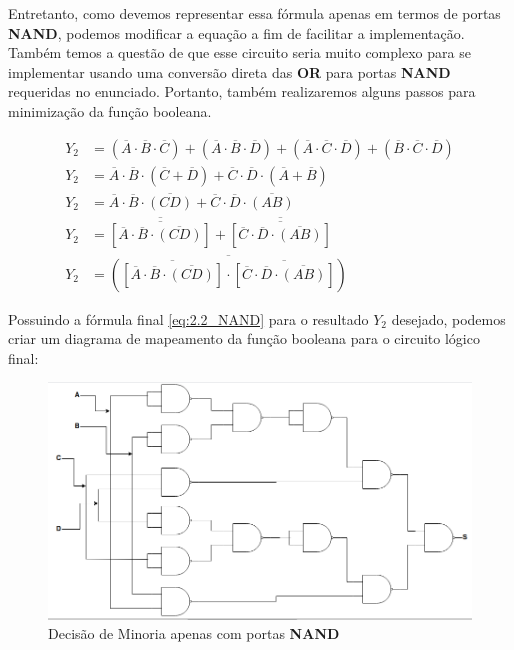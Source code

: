 \documentclass[12pt]{article}
\begin{document}
Entretanto, como devemos representar essa fórmula apenas em termos de portas
\textbf{NAND}, podemos modificar a equação a fim de facilitar a implementação.
Também temos a questão de que esse circuito seria muito complexo para se
implementar usando uma conversão direta das \textbf{OR} para portas
\textbf{NAND} requeridas no enunciado. Portanto, também realizaremos alguns
passos para minimização da função booleana.

\begin{align}
  Y_{2} &= (\overline{A} \cdot \overline{B} \cdot \overline{C}) + (\overline{A} \cdot \overline{B} \cdot \overline{D}) + (\overline{A} \cdot \overline{C} \cdot \overline{D}) + (\overline{B} \cdot \overline{C} \cdot \overline{D})\\
  Y_{2} &= \overline{A}\cdot \overline{B} \cdot (\overline{C} + \overline{D}) + \overline{C} \cdot \overline{D} \cdot (\overline{A} + \overline{B})\\
  Y_{2} &= \overline{A}\cdot\overline{B} \cdot \overline{(CD)} + \overline{C}\cdot\overline{D} \cdot \overline{(AB)}\\
  Y_{2} &= \overline{\overline{ \left[ \overline{A}\cdot\overline{B} \cdot \overline{(CD)} \right] }} + \overline{\overline{ \left[ \overline{C}\cdot\overline{D} \cdot \overline{(AB)} \right] }}\\
  Y_{2} &= \overline{ \left( \overline{ \left[ \overline{A}\cdot\overline{B} \cdot \overline{(CD)} \right] } \cdot  \overline{ \left[ \overline{C}\cdot\overline{D} \cdot \overline{(AB)} \right] } \right)} \label{eq:2.2_NAND}
\end{align}

Possuindo a fórmula final \ref{eq:2.2_NAND} para o resultado \(Y_{2}\) desejado,
podemos criar um diagrama de mapeamento da função booleana para o circuito
lógico final:

\begin{figure}[H]
    \centering
    \includegraphics[width=.9\textwidth]{Exp03/2.2.png}
    \caption{Decisão de Minoria apenas com portas \textbf{NAND}}
    \label{fig:decisao_minoria}
\end{figure}
\end{document}
